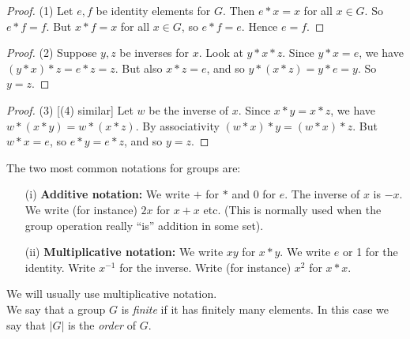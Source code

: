 \begin{proof} (1)     
 Let $e,f$ be identity elements for $G$. Then $e*x = x$ for all $x \in G$.  So $e*f = f$. But $x*f = x$ for all $x \in G$, so $e*f = e$. Hence $e = f$.
\end{proof}

\begin{proof} (2) Suppose $y, z$ be inverses for $x$. Look at $y*x*z$. Since $y*x = e$, we have $(y*x)*z = e*z = z$. But also $x*z = e$, and so $y*(x*z) = y*e = y$. So $y = z$.
\end{proof}

\begin{proof} (3) [(4) similar] Let $w$ be the inverse of $x$. Since $x*y = x*z$, we have $w*(x*y) = w*(x*z)$. By associativity $(w*x)*y = (w*x)*z$. But $w*x = e$, so $e*y = e*z$, and so $y = z$.
\end{proof} \vspace*{10pt}


The two most common notations for groups are:\begin{enumerate}
\item[(i)] \textbf{Additive notation:} We write $+$ for $*$ and 0 for $e$. The inverse of $x$ is $-x$. We write (for instance) $2x$ for $x+x$ etc. (This is normally used when the group operation really ``is'' addition in some set).
\item[(ii)] \textbf{Multiplicative notation:} We write $xy$ for $x*y$. We write $e$ or 1 for the identity. Write $x^{-1}$ for the inverse. Write (for instance) $x^2$ for $x*x$.
\end{enumerate}

We will usually use multiplicative notation.\\

We say that a group $G$ is \emph{finite} if it has finitely many elements. In this case we say that $|G|$ is the \emph{order} of $G$.\\

